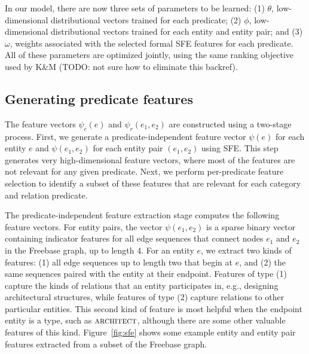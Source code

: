 \documentclass[11pt]{article}
\newcommand{\figref}[1]{Figure~\ref{fig:#1}}
\newcommand{\entity}[1]{\ensuremath{\textsc{#1}}}
\begin{document}
In our model, there are now three sets of parameters to be learned:
(1) $\theta$, low-dimensional distributional vectors trained for each
predicate; (2) $\phi$, low-dimensional distributional vectors trained
for each entity and entity pair; and (3) $\omega$, weights associated
with the selected formal SFE features for each predicate.  All of
these parameters are optimized jointly, using the same ranking
objective used by K\&M (TODO: not sure how to eliminate this backref).


\subsection{Generating predicate features}

The feature vectors $\psi_c(e)$ and $\psi_r(e_1, e_2)$ are constructed
using a two-stage process. First, we generate a predicate-independent
feature vector $\psi(e)$ for each entity $e$ and $\psi(e_1, e_2)$ for
each entity pair $(e_1, e_2)$ using SFE. This step generates very
high-dimensional feature vectors, where most of the
features are not relevant for any given predicate. Next, we perform
per-predicate feature selection to identify a subset of these features
that are relevant for each category and relation predicate.

The predicate-independent feature extraction stage computes the
following feature vectors. For entity pairs, the vector $\psi(e_1,
e_2)$ is a sparse binary vector containing indicator features for all
edge sequences that connect nodes $e_1$ and $e_2$ in the Freebase
graph, up to length 4.  For an entity $e$, we extract two kinds of
features: (1) all edge sequences up to length two that begin at $e$,
and (2) the same sequences paired with the entity at their
endpoint. Features of type (1) capture the kinds of relations that an
entity participates in, e.g., designing architectural structures,
while features of type (2) capture relations to other particular
entities. This second kind of feature is most helpful when the
endpoint entity is a type, such as \entity{architect}, although there
are some other valuable features of this kind. \figref{sfe} shows some
example entity and entity pair features extracted from a subset of the
Freebase graph.
\end{document}
